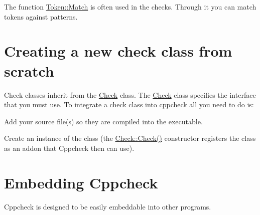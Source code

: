 The function \hyperlink{class_token_a519623098bde6496825e49364575dadf}{Token\-::\-Match} is often used in the checks. Through it you can match tokens against patterns.\hypertarget{index_checkclass_sec}{}\section{Creating a new check class from scratch}\label{index_checkclass_sec}
Check classes inherit from the \hyperlink{class_check}{Check} class. The \hyperlink{class_check}{Check} class specifies the interface that you must use. To integrate a check class into cppcheck all you need to do is\-:
\begin{DoxyItemize}
\item Add your source file(s) so they are compiled into the executable.
\item Create an instance of the class (the \hyperlink{group___core_ga0cb366bed825a49e45cce28335f75efb}{Check\-::\-Check()} constructor registers the class as an addon that Cppcheck then can use).
\end{DoxyItemize}\hypertarget{index_embedding_sec}{}\section{Embedding Cppcheck}\label{index_embedding_sec}
Cppcheck is designed to be easily embeddable into other programs.

